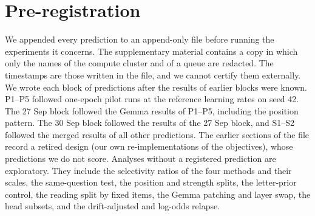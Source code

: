 \documentclass[11pt]{article}
\newcommand{\gemma}{Gemma}\newcommand{\gemmafull}{Gemma-2-2B-it}
\begin{document}


\appendix
\raggedbottom
\setcounter{dbltopnumber}{4}\renewcommand{}\renewcommand{}   %

\section{Pre-registration}
\label{app:prereg}
We appended every prediction to an append-only file before running the experiments it concerns. The supplementary material contains a copy in which only the names of the compute cluster and of a queue are redacted. The timestamps are those written in the file, and we cannot certify them externally. We wrote each block of predictions after the results of earlier blocks were known. P1--P5 followed one-epoch pilot runs at the reference learning rates on seed 42. The 27 Sep block followed the \gemma{} results of P1--P5, including the position pattern. The 30 Sep block followed the results of the 27 Sep block, and S1--S2 followed the merged results of all other predictions. The earlier sections of the file record a retired design (our own re-implementations of the objectives), whose predictions we do not score. Analyses without a registered prediction are exploratory. They include the selectivity ratios of the four methods and their scales, the same-question test, the position and strength splits, the letter-prior control, the reading split by fixed items, the \gemma{} patching and layer swap, the head subsets, and the drift-adjusted and log-odds relapse.
\end{document}
